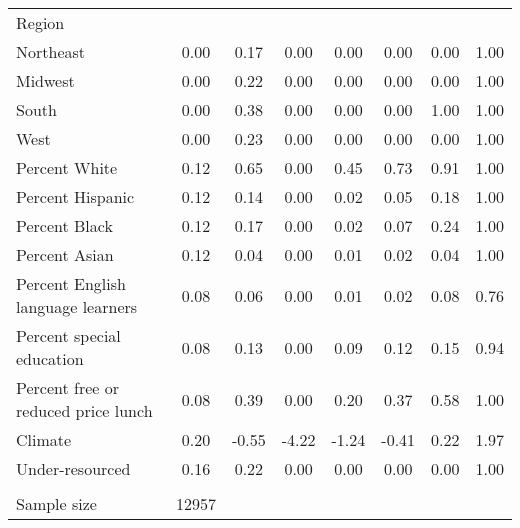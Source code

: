 \documentclass[letterpaper, 12pt]{article}
\begin{document}
{\begin{longtable}{lSSSSSSS}
  Region \\
  \hspace{1em} Northeast & 0.00 & 0.17 & 0.00 & 0.00 & 0.00 & 0.00 & 1.00 \\
  \hspace{1em} Midwest & 0.00 & 0.22 & 0.00 & 0.00 & 0.00 & 0.00 & 1.00 \\
  \hspace{1em} South & 0.00 & 0.38 & 0.00 & 0.00 & 0.00 & 1.00 & 1.00 \\
  \hspace{1em} West & 0.00 & 0.23 & 0.00 & 0.00 & 0.00 & 0.00 & 1.00 \\
  Percent White & 0.12 & 0.65 & 0.00 & 0.45 & 0.73 & 0.91 & 1.00 \\
  Percent Hispanic & 0.12 & 0.14 & 0.00 & 0.02 & 0.05 & 0.18 & 1.00 \\
  Percent Black & 0.12 & 0.17 & 0.00 & 0.02 & 0.07 & 0.24 & 1.00 \\
  Percent Asian & 0.12 & 0.04 & 0.00 & 0.01 & 0.02 & 0.04 & 1.00 \\
  Percent English language learners & 0.08 & 0.06 & 0.00 & 0.01 & 0.02 & 0.08 & 0.76 \\
  Percent special education & 0.08 & 0.13 & 0.00 & 0.09 & 0.12 & 0.15 & 0.94 \\
  Percent free or reduced price lunch & 0.08 & 0.39 & 0.00 & 0.20 & 0.37 & 0.58 & 1.00 \\
  Climate & 0.20 & -0.55 & -4.22 & -1.24 & -0.41 & 0.22 & 1.97 \\
  Under-resourced & 0.16 & 0.22 & 0.00 & 0.00 & 0.00 & 0.00 & 1.00 \\ [0.5 em]
  \hline \\ [-0.5 em]
  Sample size & 12957 \\ [0.5 em]
  \hline
\end{longtable}
}
\end{document}
